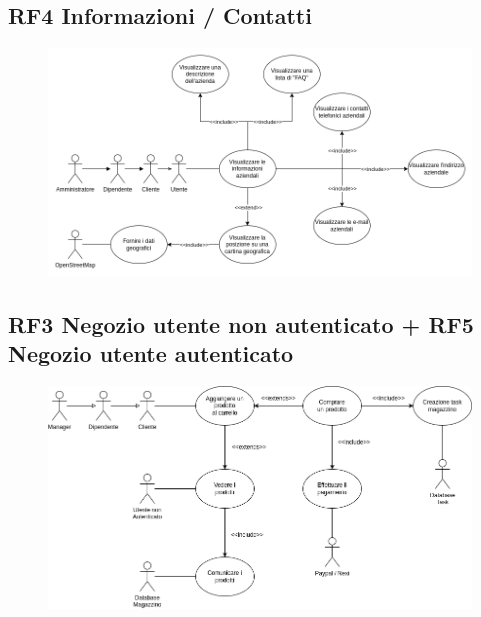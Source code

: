 \documentclass{report}
\begin{document}
\subsection*{RF4 Informazioni /  Contatti}

\begin{figure}[H]
	\centering\includegraphics[width=1\textwidth]{images/contatti_sequence_diagram.png}
\end{figure}


\subsection*{RF3 Negozio utente non autenticato + RF5 Negozio utente autenticato}

\begin{figure}[H]
	\centering\includegraphics[width=1\textwidth]{images/shop_diagram_1.png}
\end{figure}
\end{document}
